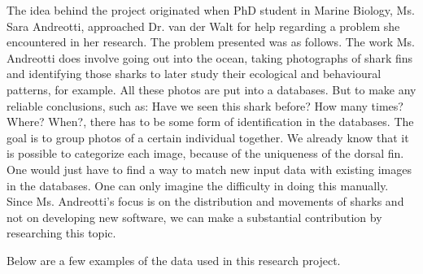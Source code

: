 \documentclass[a4paper,10pt]{article}
\begin{document}
The idea behind the project originated when PhD
student in Marine Biology, Ms. Sara Andreotti, approached Dr. van der Walt for
help regarding a problem she encountered in her research.
The problem presented was
as follows.  The work Ms. Andreotti does involve going out into the ocean,
taking photographs of shark fins and identifying those sharks to later study their ecological and behavioural
patterns, for example.
All these photos are put into a databases. But to
make any reliable conclusions, such as: Have we seen this shark before?  How
many
times? Where? When?, there has to be some form of identification in the
databases. 
The goal is to group photos of a certain individual together.  We
already know that it is possible to categorize each image, because of the
uniqueness of the dorsal fin.  One would just have to find a way to match new
input data with existing images in the databases.  One can only imagine the
difficulty in doing this manually. 
Since Ms. Andreotti's
focus is on the distribution and movements of sharks and not on developing new
software, we can make a substantial contribution by researching this topic. 

Below are a few examples of the data used in this research project.

\begin{figure}[H]
\centering
\mbox{ \quad
{} \quad
{}}
\end{figure}
\end{document}
